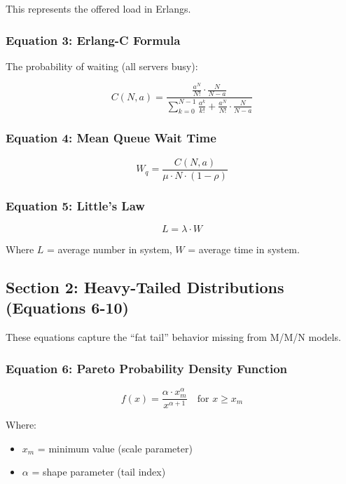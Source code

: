 \documentclass[11pt,a4paper]{article}
\begin{document}
This represents the offered load in Erlangs.

\subsubsection{Equation 3: Erlang-C Formula}

The probability of waiting (all servers busy):

\begin{equation}
C(N, a) = \frac{\frac{a^N}{N!} \cdot \frac{N}{N-a}}{\sum_{k=0}^{N-1}\frac{a^k}{k!} + \frac{a^N}{N!} \cdot \frac{N}{N-a}}
\end{equation}

\subsubsection{Equation 4: Mean Queue Wait Time}

\begin{equation}
W_q = \frac{C(N, a)}{\mu \cdot N \cdot (1-\rho)}
\end{equation}

\subsubsection{Equation 5: Little's Law}

\begin{equation}
L = \lambda \cdot W
\end{equation}

Where $L$ = average number in system, $W$ = average time in system.

\subsection{Section 2: Heavy-Tailed Distributions (Equations 6-10)}

These equations capture the ``fat tail'' behavior missing from M/M/N models.

\subsubsection{Equation 6: Pareto Probability Density Function}

\begin{equation}
f(x) = \frac{\alpha \cdot x_m^\alpha}{x^{\alpha+1}} \quad \text{for } x \geq x_m
\end{equation}

Where:
\begin{itemize}
    \item $x_m$ = minimum value (scale parameter)
    \item $\alpha$ = shape parameter (tail index)
\end{itemize}
\end{document}

